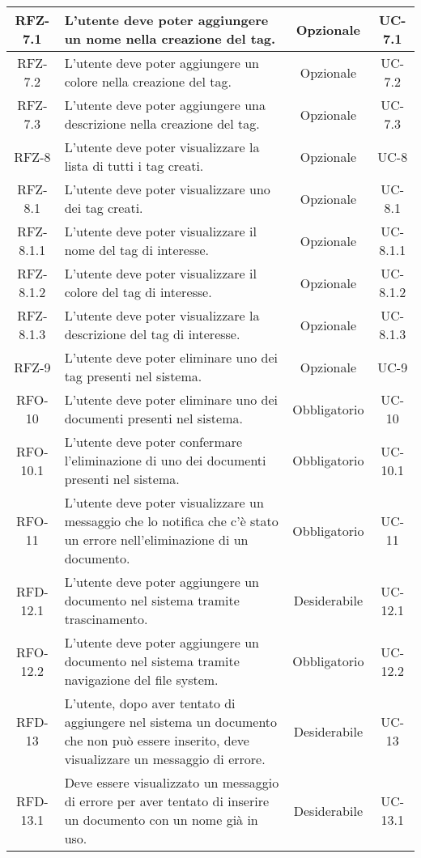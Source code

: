 \begin{xltabular}{\textwidth}{| c | X | c | c |}
    \hline
    RFZ-7.1 & L’utente deve poter aggiungere un nome nella creazione del tag. & Opzionale & UC-7.1 \\
    \hline
    RFZ-7.2 & L’utente deve poter aggiungere un colore nella creazione del tag. & Opzionale & UC-7.2 \\
    \hline
    RFZ-7.3 & L’utente deve poter aggiungere una descrizione nella creazione del tag. & Opzionale & UC-7.3 \\
    \hline
    RFZ-8 & L’utente deve poter visualizzare la lista di tutti i tag creati. & Opzionale & UC-8 \\
    \hline
    RFZ-8.1 & L’utente deve poter visualizzare uno dei tag creati. & Opzionale & UC-8.1 \\
    \hline
    RFZ-8.1.1 & L’utente deve poter visualizzare il nome del tag di interesse. & Opzionale & UC-8.1.1 \\
    \hline
    RFZ-8.1.2 & L’utente deve poter visualizzare il colore del tag di interesse. & Opzionale & UC-8.1.2 \\
    \hline
    RFZ-8.1.3 & L’utente deve poter visualizzare la descrizione del tag di interesse. & Opzionale & UC-8.1.3 \\
    \hline
    RFZ-9 & L’utente deve poter eliminare uno dei tag presenti nel sistema. & Opzionale & UC-9 \\
    \hline
    RFO-10 & L’utente deve poter eliminare uno dei documenti presenti nel sistema. & Obbligatorio & UC-10 \\
    \hline
    RFO-10.1 & L’utente deve poter confermare l’eliminazione di uno dei documenti presenti nel sistema. & Obbligatorio & UC-10.1 \\
    \hline
    RFO-11 & L'utente deve poter visualizzare un messaggio che lo notifica che c'è stato un errore nell'eliminazione di un documento. & Obbligatorio & UC-11 \\
    \hline
    RFD-12.1 & L’utente deve poter aggiungere un documento nel sistema tramite trascinamento. & Desiderabile & UC-12.1 \\
    \hline
    RFO-12.2 & L’utente deve poter aggiungere un documento nel sistema tramite navigazione del file system. & Obbligatorio & UC-12.2 \\
    \hline
    RFD-13 & L’utente, dopo aver tentato di aggiungere nel sistema un documento che non può essere inserito, deve visualizzare un messaggio di errore. & Desiderabile & UC-13 \\
    \hline
    RFD-13.1 & Deve essere visualizzato un messaggio di errore per aver tentato di inserire un documento con un nome già in uso. & Desiderabile & UC-13.1 \\

\end{xltabular}
